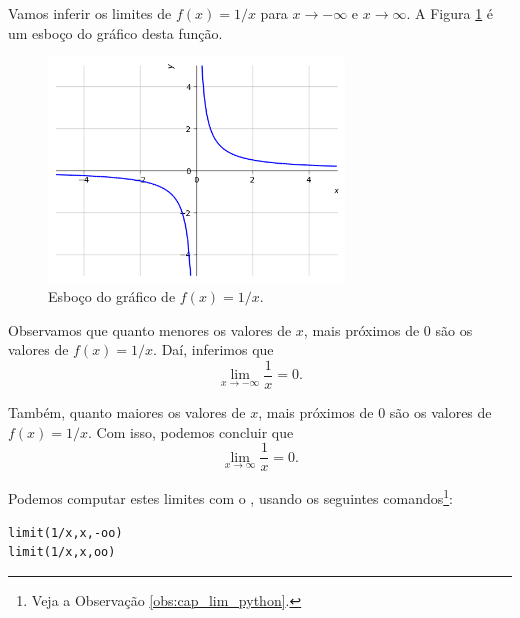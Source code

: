 \begin{ex}
  Vamos inferir os limites de $f(x) = 1/x$ para $x\to -\infty$ e $x\to \infty$. A Figura \ref{fig:lim_xinf_1x} é um esboço do gráfico desta função.

\begin{figure}[H]
  \centering
  \includegraphics[width=0.7\textwidth]{./cap_lim/dados/fig_lim_xinf_1x/fig_lim_xinf_1x}
  \caption{Esboço do gráfico de $f(x) = 1/x$.}
  \label{fig:lim_xinf_1x}
\end{figure}

Observamos que quanto menores os valores de $x$, mais próximos de $0$ são os valores de $f(x)=1/x$. Daí, inferimos que
\begin{equation}
  \lim_{x\to -\infty} \frac{1}{x} = 0.
\end{equation}

Também, quanto maiores os valores de $x$, mais próximos de $0$ são os valores de $f(x)=1/x$. Com isso, podemos concluir que
\begin{equation}
  \lim_{x\to \infty} \frac{1}{x} = 0.
\end{equation}

\ifispython
Podemos computar estes limites com o \sympy, usando os seguintes comandos\footnote{Veja a Observação \ref{obs:cap_lim_python}.}:
\begin{verbatim}
limit(1/x,x,-oo)
limit(1/x,x,oo)
\end{verbatim}
\fi
\end{ex}

